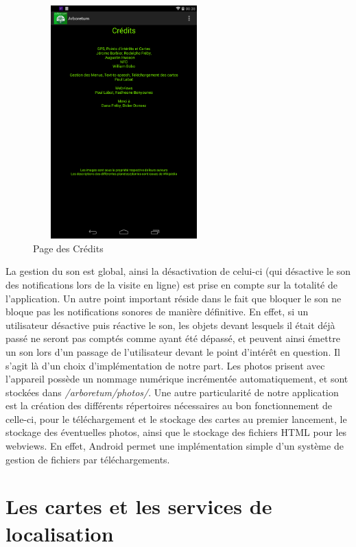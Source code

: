 \documentclass[a4paper,11pt]{article}
\begin{document}
    \begin{figure}[H]
     \begin{center}
      \includegraphics[width=7cm,height=9cm]{credit.png}
      \caption{Page des Crédits}
     \end{center}
    \end{figure}
		La gestion du son est global, ainsi la désactivation de celui-ci (qui désactive le son des notifications lors de la visite en ligne) est prise en compte sur la totalité de l'application. 
		Un autre point important réside dans le fait que bloquer le son ne bloque pas les notifications sonores de manière définitive. En effet, si un utilisateur désactive puis réactive le son, 
		les objets devant lesquels il était déjà passé ne seront pas comptés comme ayant été dépassé, et peuvent ainsi émettre un son lors d'un passage de l'utilisateur devant le point d’intérêt en question. 
		Il s'agit là d'un choix d'implémentation de notre part.
		Les photos prisent avec l'appareil possède un nommage numérique incrémentée automatiquement, et sont stockées dans \emph{/arboretum/photos/}. 
		Une autre particularité de notre application est la création des différents répertoires nécessaires au bon fonctionnement de 
		celle-ci, pour le téléchargement et le stockage des cartes au premier lancement, le stockage des éventuelles photos, ainsi que le stockage des fichiers HTML pour les webviews.
		En effet, Android permet une implémentation simple d'un système de gestion de fichiers par téléchargements. %
		
		\section{Les cartes et les services de localisation}
		  
\end{document}
